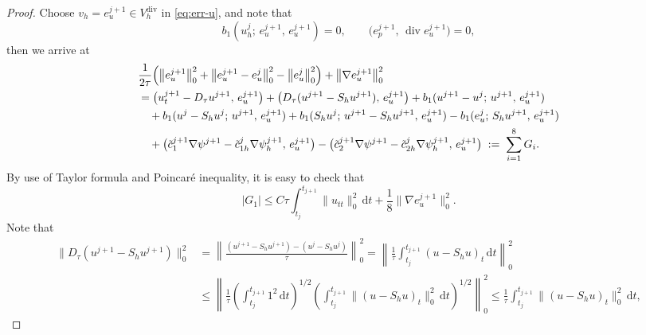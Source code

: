 \begin{proof}
Choose $v_{h} = e_{u}^{j+1} \in V_{h}^{\mathrm{div}}$ in \eqref{eq:err-u}, and note that
\begin{equation}\label{eq:b1-cancel}
  b_{1}(u_{h}^{j};\, e_{u}^{j+1},\, e_{u}^{j+1}) = 0, \qquad
  \bigl(e_{p}^{j+1},\, \operatorname{div} e_{u}^{j+1}\bigr) = 0,
\end{equation}
then we arrive at
\begin{align}
  &\frac{1}{2\tau}\Bigl(\bigl\|e_{u}^{j+1}\bigr\|_{0}^{2}
                       + \bigl\|e_{u}^{j+1} - e_{u}^{j}\bigr\|_{0}^{2}
                       - \bigl\|e_{u}^{j}\bigr\|_{0}^{2}\Bigr)
   + \bigl\|\nabla e_{u}^{j+1}\bigr\|_{0}^{2}
  \nonumber\\
  &= \bigl(u_{t}^{j+1} - D_{\tau}u^{j+1},\, e_{u}^{j+1}\bigr)
   + \bigl(D_{\tau}(u^{j+1} - S_{h}u^{j+1}),\, e_{u}^{j+1}\bigr)
   + b_{1}(u^{j+1}-u^{j};\, u^{j+1},\, e_{u}^{j+1})
  \nonumber\\
  &\quad + b_{1}(u^{j} - S_{h}u^{j};\, u^{j+1},\, e_{u}^{j+1})
   + b_{1}(S_{h}u^{j};\, u^{j+1} - S_{h}u^{j+1},\, e_{u}^{j+1})
   - b_{1}(e_{u}^{j};\, S_{h}u^{j+1},\, e_{u}^{j+1})
  \nonumber\\
  &\quad + \bigl(\tilde{c}_{1}^{j+1}\nabla\psi^{j+1}
              - \tilde{c}_{1h}^{j}\nabla\psi_{h}^{j+1},\, e_{u}^{j+1}\bigr)
   - \bigl(\tilde{c}_{2}^{j+1}\nabla\psi^{j+1}
              - \tilde{c}_{2h}^{j}\nabla\psi_{h}^{j+1},\, e_{u}^{j+1}\bigr)
   \;:=\; \sum_{i=1}^{8}G_{i}.
  \label{eq:G-sum}
\end{align}
By use of Taylor formula and Poincar\'{e} inequality, it is easy to check that
\begin{equation}\label{eq:G1}
  |G_{1}| \leq C\tau\int_{t_{j}}^{t_{j+1}}\|u_{tt}\|_{0}^{2}\,\mathrm{d}t
             + \frac{1}{8}\bigl\|\nabla e_{u}^{j+1}\bigr\|_{0}^{2}.
\end{equation}
Note that
\begin{align}
  \bigl\|D_{\tau}(u^{j+1} - S_{h}u^{j+1})\bigr\|_{0}^{2}
  &= \left\|\frac{(u^{j+1} - S_{h}u^{j+1}) - (u^{j} - S_{h}u^{j})}{\tau}\right\|_{0}^{2}
   = \left\|\frac{1}{\tau}\int_{t_{j}}^{t_{j+1}}(u - S_{h}u)_{t}\,\mathrm{d}t\right\|_{0}^{2}
  \nonumber\\
  &\leq \left\|\frac{1}{\tau}\left(\int_{t_{j}}^{t_{j+1}}1^{2}\,\mathrm{d}t\right)^{\!1/2}
         \left(\int_{t_{j}}^{t_{j+1}}\|(u - S_{h}u)_{t}\|_{0}^{2}\,\mathrm{d}t\right)^{\!1/2}
        \right\|_{0}^{2}
  \leq \frac{1}{\tau}\int_{t_{j}}^{t_{j+1}}\|(u - S_{h}u)_{t}\|_{0}^{2}\,\mathrm{d}t,
  \label{eq:Dtau-Shu}

\end{align}
\end{proof}
